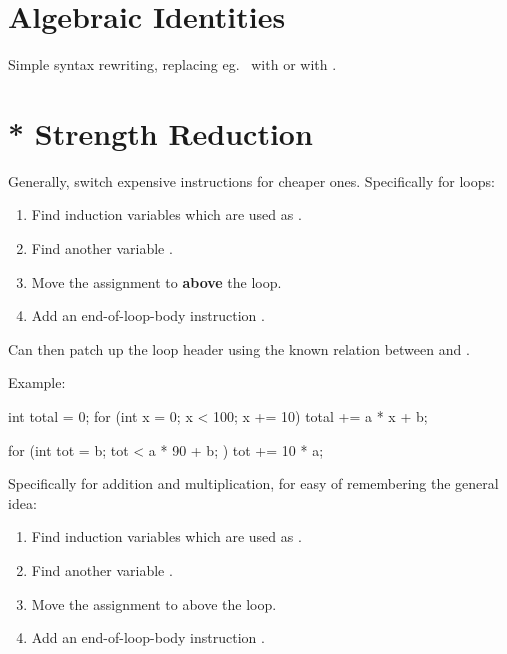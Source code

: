 \documentclass[a4paper, 11pt]{article}
\begin{document}
\section*{Algebraic Identities}
{
    Simple syntax rewriting, replacing eg.\  with  or \monospace{[1,2] ++ [3,4]} with \monospace{[1,2,3,4]}.
}
\section*{* Strength Reduction}
{
    Generally, switch expensive instructions for cheaper ones. Specifically for loops:

    \begin{enumerate}
    \item Find induction variables which are used as .
    \item Find another variable .
    \item Move the assignment  to \textbf{above} the loop.
    \item Add an end-of-loop-body instruction .
    \end{enumerate}

    Can then patch up the loop header using the known relation between  and .

    Example:

    \begin{minipage}[t]{0.45\textwidth}
    \begin{monospacefigure}
    int total = 0;
    for (int x = 0; x < 100; x += 10)
        total += a * x + b;
    \end{monospacefigure}
    \end{minipage}
    \hspace{5mm}
    \begin{minipage}[t]{0.45\textwidth}
    \begin{monospacefigure}
    for (int tot = b; tot < a * 90 + b; )
        tot += 10 * a;
    \end{monospacefigure}
    \end{minipage}

    \vspace{3mm}
    Specifically for addition and multiplication, for easy of remembering the general idea:
    \begin{enumerate}
    \item Find induction variables which are used as .
    \item Find another variable .
    \item Move the assignment  to above the loop.
    \item Add an end-of-loop-body instruction .
    \end{enumerate}
}
\end{document}
